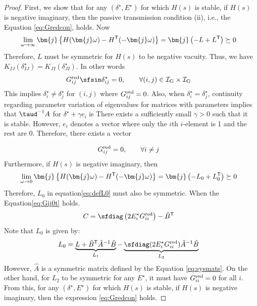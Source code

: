 \documentclass[graybox, envcountchap]{svmult}
\begin{document}
\begin{proof}
First, we show that for any $(\delta^{\star},E^{\star})$ for which $H(s)$ is stable, if $H(s)$ is negative imaginary, then the passive transmission condition (ii), i.e., the Equation \ref{eq:Gredcon}, holds.
Now
\[
\lim_{\omega \rightarrow \infty} \bm{j}
\left\{
H(\bm{j}\omega)-H^{\sf T}(-\bm{j}\omega)
\right\}
=\bm{j}
\left(
-L+L^{\sf T}
\right) \succeq 0
\]
Therefore, $L$ must be symmetric for $H(s)$ to be negative vacuity.
Thus, we have $K_{IJ}(\delta_{IJ}^{\star}) = K_{JI}(\delta_{JI}^{\star})$.
In other words
\[
G^{\rm red}_{ij} \sfsin \delta_{ij}^{\star} = 0 ,\qquad
\forall (i, j) \in \mathcal{I}_{\rm G} \times \mathcal{I}_{\rm G}
\]
This implies $\delta_{i}^{\star}\neq \delta_{j}^{\star}$ for $(i,j)$ where $G^{\rm red}_{ij}=0$.
Also, when $\delta_{i}^{\star}= \delta_{j}^{\star}$, continuity regarding parameter variation of eigenvalues for matrices with parameters implies that $\taud^{-1}A$ for $\delta^{\star}+\gamma e_i$ is There exists a sufficiently small $\gamma>0$ such that it is stable.
However, $e_i$ denotes a vector where only the $i$th $i$-element is 1 and the rest are 0.
Therefore, there exists a vector

\begin{align}\label{eq:Gij0t}
G^{\rm red}_{ij}=0, \qquad
\forall i\neq j
\end{align}
Furthermore, if $H(s)$ is negative imaginary, then
\[
\lim_{\omega \rightarrow 0} \bm{j}
\left\{
H(\bm{j}\omega)-H^{\sf T}(-\bm{j}\omega)
\right\}
=\bm{j}
\left(
-L_0+L_0^{\sf T}
\right) \succeq 0
\]
Therefore, $L_0$ in equation\ref{eq:defL0} must also be symmetric.
When the Equation\ref{eq:Gij0t} holds.
\[
C = \sfdiag \left(
2E_i^{\star} G^{\rm red}_{ii}
\right)  - \hat{B}^{\sf T}
\]
Note that $L_0$ is given by:
\[
L_0 = \underbrace{ L + \hat{B}^{\sf T} \hat{A}^{-1} \hat{B} }_{L_1}
-
\underbrace{ \sfdiag (
2 E_i^{\star} G^{\rm red}_{ii}
) \hat{A}^{-1} \hat{B}
}_{L_2}
\]
However, $\hat{A}$ is a symmetric matrix defined by the Equation \ref{eq:sysmats}.
On the other hand, for $L_2$ to be symmetric for any $E^{\star}$, it must have $G^{\rm red}_{ii}=0$ for all $i$.
From this, for any $(\delta^{\star},E^{\star})$ for which $H(s)$ is stable, if $H(s)$ is negative imaginary, then the expression \ref{eq:Gredcon} holds.


\end{proof}
\end{document}
